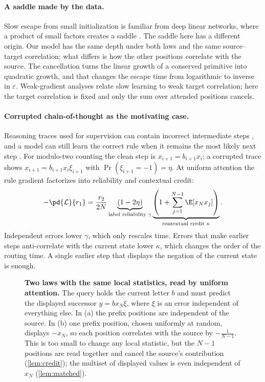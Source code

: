 \paragraph{A saddle made by the data.}
Slow escape from small initialization is familiar from deep linear networks, where a product of small factors creates a saddle
\citep{saxe2014exact,shamir2019exponential}. The saddle here has a different origin. Our model has the same depth under both laws and the same
source--target correlation; what differs is how the other positions correlate with the source. The cancellation turns the linear growth of a
conserved primitive into quadratic growth, and that changes the escape time from logarithmic to inverse in $\varepsilon$.
Weak-gradient analyses \citep{shalevshwartz2017failures,abbe2025parities} relate slow learning to weak target correlation; here the target correlation is fixed
and only the sum over attended positions cancels.

\paragraph{Corrupted chain-of-thought as the motivating case.}
Reasoning traces used for supervision can contain incorrect intermediate steps \citep{havrilla2024noise,zhou2024noisyrationales},
and a model can still learn the correct rule when it remains the most likely next step \citep{natarajan2013noisy,patrini2017loss}.
For modulo-two counting the clean step is $x_{i+1}=b_{i+1}x_i$; a corrupted trace shows $x_{i+1}=b_{i+1}x_i\xi_{i+1}$ with $\Pr(\xi_{i+1}=-1)=\eta$.
At uniform attention the rule gradient factorizes into reliability and contextual credit:
\[
 -\pd{\mathcal L}{r_1}
 =\frac{r_2}{2N}
 \underbrace{(1-2\eta)}_{\text{label reliability }\gamma}
 \underbrace{\left(1+\sum_{j=1}^{N-1}\E[x_Nx_j]\right)}_{\text{contextual credit }\kappa}.
\]
Independent errors lower $\gamma$, which only rescales time. Errors that make earlier steps anti-correlate with the current state lower $\kappa$,
which changes the order of the routing time. A single earlier step that displays the negation of the current state is enough.

\begin{figure}[t]
\centering
\resizebox{\linewidth}{!}{}
\caption{\textbf{Two laws with the same local statistics, read by uniform attention.} The query holds the current letter $b$ and
must predict the displayed successor $y=b x_N \xi$, where $\xi$ is an error independent of everything else. In (a) the prefix
positions are independent of the source. In (b) one prefix position, chosen uniformly at random, displays $-x_N$, so each position
correlates with the source by $-\tfrac{1}{N-1}$. This is too small to change any local statistic, but the $N-1$ positions are read
together and cancel the source's contribution (\cref{lem:credit}); the multiset of displayed values is even independent of $x_N$ (\cref{lem:matched}).}
\label{fig:cancel}
\end{figure}

